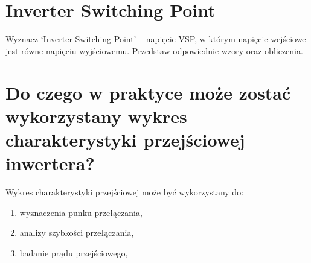 \documentclass[a4paper, 11pt]{article}
\begin{document}
\section{Inverter Switching Point}\label{sec:nverter_switching_point} %
Wyznacz ‘Inverter Switching Point’ – napięcie VSP, w którym napięcie wejściowe jest równe napięciu
wyjściowemu. Przedstaw odpowiednie wzory oraz obliczenia.


\section{Do czego w praktyce może zostać wykorzystany wykres charakterystyki przejściowej inwertera?}\label{sec:} %

Wykres charakterystyki przejściowej może być wykorzystany do:

\begin{enumerate}
	\item wyznaczenia punku przełączania,
	\item analizy szybkości przełączania,
	\item badanie prądu przejściowego,
\end{enumerate}


\end{document}
